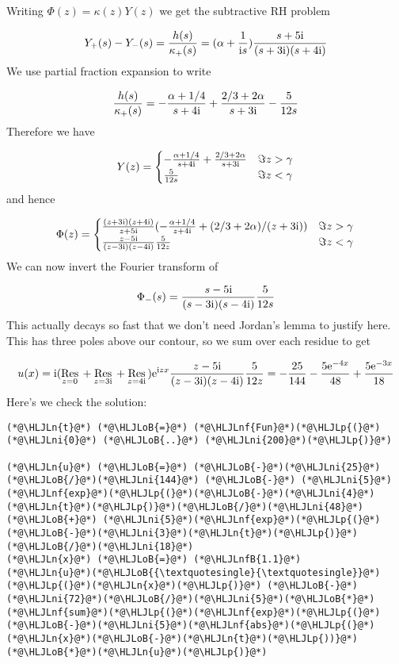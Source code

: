 \documentclass[12pt,a4paper]{article}
\newcommand{\HLJLn}[1]{#1}
\newcommand{\HLJLnf}[1]{\textcolor[RGB]{66,102,213}{#1}}
\newcommand{\HLJLnfB}[1]{\textcolor[RGB]{59,151,46}{#1}}
\newcommand{\HLJLni}[1]{\textcolor[RGB]{59,151,46}{#1}}
\newcommand{\HLJLoB}[1]{\textcolor[RGB]{102,102,102}{\textbf{#1}}}
\newcommand{\HLJLp}[1]{#1}
\def\I{ {\rm i} }
\def\E{ {\rm e} }
\def\Res_#1{\underset{#1}{\rm Res}\,}
\begin{document}
Writing $\Phi(z) = \kappa(z) Y(z)$ we get the subtractive RH problem

\[
Y_+(s) - Y_-(s) = {h(s) \over \kappa_+(s)} =  (\alpha + {1 \over \I s}) {s + 5 \I \over (s + 3 \I)(s + 4 \I)}
\]
We use partial fraction expansion to write

\[
{h(s) \over \kappa_+(s)} = -{\alpha + 1/4 \over s+4 \I} + {2/3 + 2 \alpha \over s+3 \I} - {5 \over 12 s}
\]
Therefore we have

\[
Y(z) = \begin{cases}
-{\alpha + 1/4 \over s+4 \I} + {2/3 + 2 \alpha \over s+3 \I} & \Im z > \gamma \\
        {5 \over 12 s} &\Im z < \gamma
\end{cases}
\]
and hence

\[
\Phi(z) =      \begin{cases}
{(z+3\I)(z+4\I) \over z+5\I} (-{\ensuremath{\alpha}+1/4 \over z+4\I} + (2/3 + 2\ensuremath{\alpha})/(z+3\I)) & \Im z > \gamma \\
        {z-5\I \over (z-3\I)(z-4\I)} {5 \over 12z}& \Im z < \gamma
        \end{cases}
\]
We can now invert the Fourier transform of

\[
\Phi_-(s) =         {s-5\I \over (s-3\I)(s-4\I)} {5 \over 12s}
\]
This actually decays so fast that we don't need Jordan's lemma to justify here. This has three poles above our contour, so we sum over each residue to get

\[
u(x) = \I (\Res_{z = 0} +\Res_{z = 3 \I } +\Res_{z = 4\I} )      \E^{\I z x }   {z-5\I \over (z-3\I)(z-4\I)} {5 \over 12z} =  -{25 \over 144} - {5 \E^{-4 x}  \over 48} + {5 \E^{-3 x} \over 18}
\]
Here's we check the solution:


\begin{lstlisting}
(*@\HLJLn{t}@*) (*@\HLJLoB{=}@*) (*@\HLJLnf{Fun}@*)(*@\HLJLp{(}@*)(*@\HLJLni{0}@*) (*@\HLJLoB{..}@*) (*@\HLJLni{200}@*)(*@\HLJLp{)}@*)

(*@\HLJLn{u}@*) (*@\HLJLoB{=}@*) (*@\HLJLoB{-}@*)(*@\HLJLni{25}@*)(*@\HLJLoB{/}@*)(*@\HLJLni{144}@*) (*@\HLJLoB{-}@*) (*@\HLJLni{5}@*)(*@\HLJLnf{exp}@*)(*@\HLJLp{(}@*)(*@\HLJLoB{-}@*)(*@\HLJLni{4}@*)(*@\HLJLn{t}@*)(*@\HLJLp{)}@*)(*@\HLJLoB{/}@*)(*@\HLJLni{48}@*) (*@\HLJLoB{+}@*) (*@\HLJLni{5}@*)(*@\HLJLnf{exp}@*)(*@\HLJLp{(}@*)(*@\HLJLoB{-}@*)(*@\HLJLni{3}@*)(*@\HLJLn{t}@*)(*@\HLJLp{)}@*)(*@\HLJLoB{/}@*)(*@\HLJLni{18}@*)
(*@\HLJLn{x}@*) (*@\HLJLoB{=}@*) (*@\HLJLnfB{1.1}@*)
(*@\HLJLn{u}@*)(*@\HLJLoB{{\textquotesingle}{\textquotesingle}}@*)(*@\HLJLp{(}@*)(*@\HLJLn{x}@*)(*@\HLJLp{)}@*) (*@\HLJLoB{-}@*) (*@\HLJLni{72}@*)(*@\HLJLoB{/}@*)(*@\HLJLni{5}@*)(*@\HLJLoB{*}@*)(*@\HLJLnf{sum}@*)(*@\HLJLp{(}@*)(*@\HLJLnf{exp}@*)(*@\HLJLp{(}@*)(*@\HLJLoB{-}@*)(*@\HLJLni{5}@*)(*@\HLJLnf{abs}@*)(*@\HLJLp{(}@*)(*@\HLJLn{x}@*)(*@\HLJLoB{-}@*)(*@\HLJLn{t}@*)(*@\HLJLp{))}@*)(*@\HLJLoB{*}@*)(*@\HLJLn{u}@*)(*@\HLJLp{)}@*)
\end{lstlisting}
\end{document}
